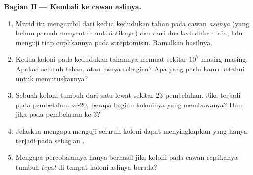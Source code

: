 \begin{problem}
\medskip
\noindent\textbf{Bagian II --- Kembali ke cawan aslinya.}
\begin{enumerate}[resume]
  \item Murid itu mengambil  dari kedua kedudukan tahan pada cawan
        \emph{aslinya} (yang belum pernah menyentuh antibiotiknya) dan
        dari dua kedudukan lain, lalu menguji tiap cuplikannya pada
        streptomisin. Ramalkan hasilnya.
  \item Kedua koloni pada kedudukan tahannya memuat sekitar $10^7$ 
        masing-masing. Apakah seluruh  tahan, atau hanya
        sebagian? Apa yang perlu kamu ketahui untuk memutuskannya?
  \item Sebuah koloni tumbuh dari satu  lewat sekitar 23 pembelahan.
        Jika  terjadi pada pembelahan ke-20, berapa bagian 
        koloninya yang membawanya? Dan jika pada pembelahan ke-3?
  \item Jelaskan mengapa menguji seluruh koloni dapat menyingkapkan
         yang hanya terjadi pada sebagian .
  \item Mengapa percobaannya hanya berhasil jika koloni pada cawan
        replikanya tumbuh \emph{tepat} di tempat koloni aslinya berada?
\end{enumerate}


\end{problem}
